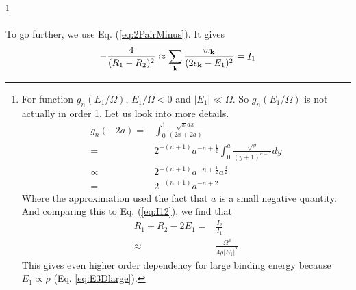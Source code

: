 \documentclass[aps,prb,showpacs,reprint]{revtex4-1}
\begin{document}
\footnote{
For function $g_{n}(E_{1}/\Omega)$, $E_{1}/\Omega<0$ and $|E_{1}|\ll\Omega$.  So $g_{n}(E_{1}/\Omega)$ is not actually in order 1.  Let us look into more details.  
\begin{equation}
\begin{split}
g_{n}(-2a)=&\int_{0}^{1}\frac{\sqrt{x}dx}{(2x+2a)}\\
       =&2^{-(n+1)}a^{-n+\frac{1}{2}}\int^{a}_{0}\frac{\sqrt{y}}{(y+1)^{n+1}}dy\\
       \propto&2^{-(n+1)}a^{-n+\frac{1}{2}}a^{\frac{3}{2}}\\
       =&2^{-(n+1)}a^{-n+{2}}
\end{split}
\end{equation}
Where the approximation used the fact that $a$ is a small negative quantity. And comparing this to Eq. (\ref{eq:I12}), we find that 
\begin{equation}
\begin{split}
R_{1}+R_{2}-2E_{1}=&\frac{I_{2}}{I_{1}}\\
\approx&\frac{\Omega^{3}}{4\rho|E_{1}|^{2}}
\end{split}
\end{equation}
This gives even higher order dependency for large binding energy because $E_{1}\propto\rho$ (Eq. \ref{eq:E3Dlarge}).



}




To go further, we use Eq. (\ref{eq:2PairMinus}). It gives 
\begin{equation}
-\frac{4}{(R_1-R_2)^2}\approx\sum_{\mathbf{k}}\frac{w_{\mathbf{k}}}{(2\epsilon_{\mathbf{k}}-E_1)^2}=I_1
\label{eq:}
\end{equation}


\end{document}
